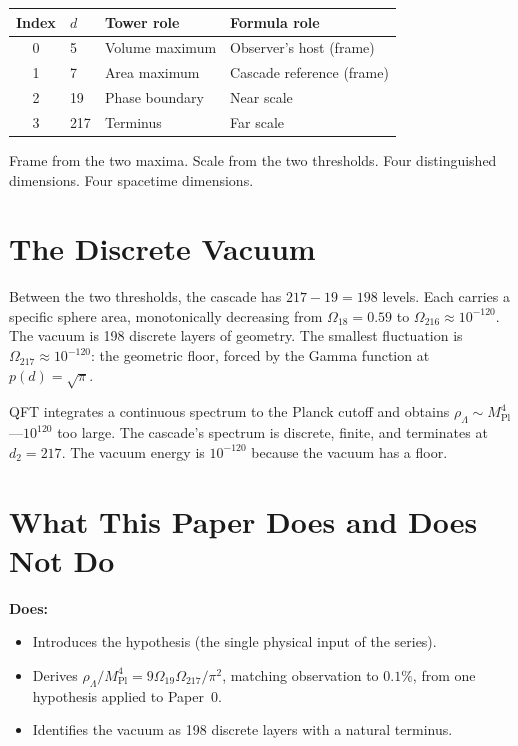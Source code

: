 \documentclass[11pt,a4paper]{article}
\begin{document}
\begin{center}
\begin{tabular}{clll}
\toprule
Index & $d$ & Tower role & Formula role \\
\midrule
0 & 5 & Volume maximum & Observer's host (frame) \\
1 & 7 & Area maximum & Cascade reference (frame) \\
2 & 19 & Phase boundary & Near scale \\
3 & 217 & Terminus & Far scale \\
\bottomrule
\end{tabular}
\end{center}

Frame from the two maxima. Scale from the two thresholds. Four
distinguished dimensions. Four spacetime dimensions.

\section{The Discrete Vacuum}

Between the two thresholds, the cascade has $217 - 19 = 198$ levels. Each
carries a specific sphere area, monotonically decreasing from
$\Omega_{18} = 0.59$ to $\Omega_{216}\approx 10^{-120}$. The vacuum is
198 discrete layers of geometry. The smallest fluctuation is
$\Omega_{217}\approx 10^{-120}$: the geometric floor, forced by the Gamma
function at $p(d) = \sqrt{\pi}$.

QFT integrates a continuous spectrum to the Planck cutoff and obtains
$\rho_\Lambda\sim M^4_{\mathrm{Pl}}$---$10^{120}$ too large. The cascade's
spectrum is discrete, finite, and terminates at $d_2 = 217$. The vacuum
energy is $10^{-120}$ because the vacuum has a floor.

\section{What This Paper Does and Does Not Do}

\textbf{Does:}
\begin{itemize}
\item Introduces the hypothesis (the single physical input of the series).
\item Derives $\rho_\Lambda/M^4_{\mathrm{Pl}} =
9\Omega_{19}\Omega_{217}/\pi^2$, matching observation to $0.1\%$, from one
hypothesis applied to Paper~0.
\item Identifies the vacuum as 198 discrete layers with a natural terminus.
\end{itemize}
\end{document}
